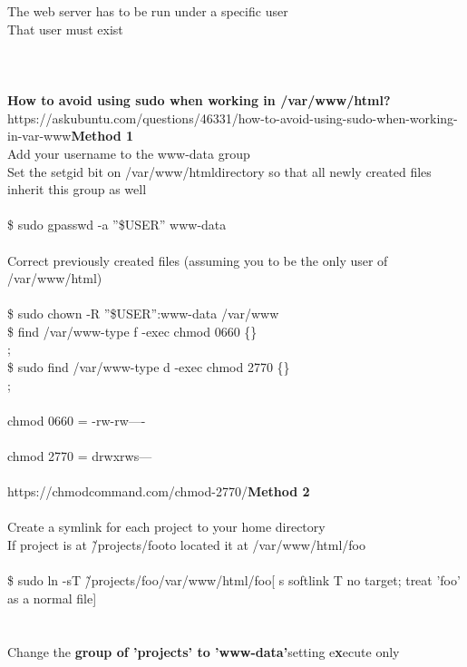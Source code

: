 \documentclass[10pt,a4paper]{article}
\begin{document}
{{{{{{{{{{{{{{{{{{{{\\
\\
The web server has to be run under a specific user\\
That user must exist\\
\\
\\
\\
}\textbf{{\Large How to avoid using sudo when working in /var/www/html?}}{\large }https://askubuntu.com/questions/46331/how-to-avoid-using-sudo-when-working-in-var-www{\large \textbf{Method 1}}{\large \\
Add your username to the www-data group\\
Set the setgid bit on /var/www/html}{\large  directory so that all newly created files inherit this group as well\\
\\
\$ sudo gpasswd -a ''\$USER'' www-data\\
\\
Correct previously created files (assuming you to be the only user of /var/www/html}{\large  )\\
\\
\$ sudo chown -R ''\$USER'':www-data /var/www}{\large \\
\$ find /var/www}{\large  -type f -exec chmod 0660 \{\} \\;\\
\$ sudo find /var/www}{\large  -type d -exec chmod 2770 \{\} \\;\\
\\
chmod 0660    =   -rw-rw----\\
\\
chmod 2770    =  drwxrws---\\
\\
}https://chmodcommand.com/chmod-2770/{\large \textbf{Method 2}}{\large \\
\\
Create a symlink for each project to your home directory\\
If project is at \~/projects/foo}{\large  to located it at /var/www/html/foo}{\large  \\
\\
\$ sudo ln -sT \~/projects/foo}{\large /var/www/html/foo}{\large       [ s softlink   T  no target; treat 'foo' as a normal file]\\
\\
\\
Change the \textbf{group of 'projects' to 'www-data'}}{\large  setting e\textbf{x}}{\large ecute only\\
}}}}}}}}}}}}}}}}}}}}
\end{document}
